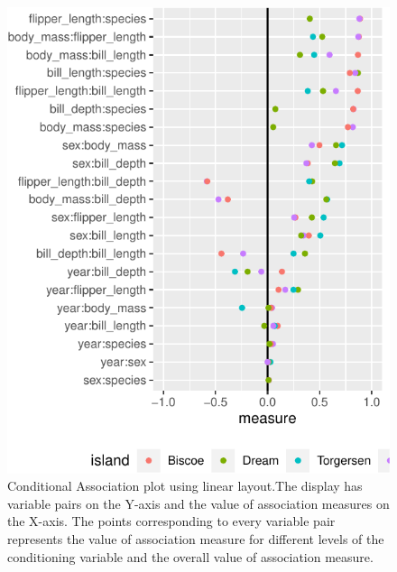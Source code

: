 \begin{Schunk}
\begin{figure}

{\centering \includegraphics{rj_paper_files/figure-latex/linear_cond_assoc-1} 

}

\caption[Conditional Association plot using linear layout.The display has variable pairs on the Y-axis and the value of association measures on the X-axis]{Conditional Association plot using linear layout.The display has variable pairs on the Y-axis and the value of association measures on the X-axis. The points corresponding to every variable pair represents the value of association measure for different levels of the conditioning variable and the overall value of association measure.}\label{fig:linear_cond_assoc}
\end{figure}
\end{Schunk}



\address{%
Amit Chinwan\\
Maynooth University\\%
Hamilton Institute\\ Maynooth, Ireland\\
%
%
%
\href{mailto:amit.chinwan.2019@mumail.ie}{\nolinkurl{amit.chinwan.2019@mumail.ie}}%
}

\address{%
Catherine Hurley\\
Maynooth University\\%
Department of Mathematics and Statistics\\ Maynooth, Ireland\\
%
%
%
\href{mailto:catherine.hurley@mu.ie}{\nolinkurl{catherine.hurley@mu.ie}}%
}
